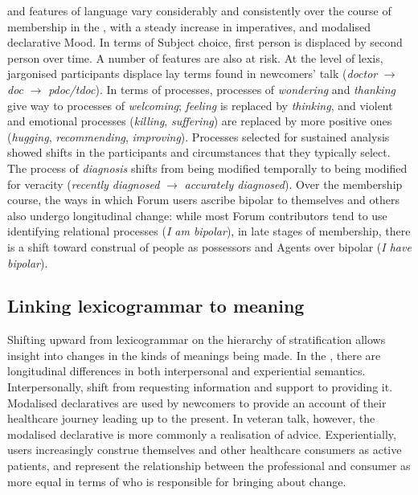  and  features of language vary considerably and consistently over the course of membership in the , with a steady increase in imperatives, and modalised declarative Mood. In terms of Subject choice, first person is displaced by second person over time. A number of  features are also at risk. At the level of lexis, jargonised participants displace lay terms found in newcomers' talk (\emph{doctor} $\rightarrow$ \emph{doc} $\rightarrow$ \emph{pdoc\slash tdoc}). In terms of processes, processes of \emph{wondering} and \emph{thanking} give way to processes of \emph{welcoming}; \emph{feeling} is replaced by \emph{thinking}, and violent and emotional processes (\emph{killing}, \emph{suffering}) are replaced by more positive ones (\emph{hugging}, \emph{recommending}, \emph{improving}). Processes selected for sustained analysis showed shifts in the participants and circumstances that they typically select. The process of \emph{diagnosis} shifts from being modified temporally to being modified for veracity (\emph{recently diagnosed} $\rightarrow$ \emph{accurately diagnosed}). Over the membership course, the ways in which \gls{Forum} users ascribe \gls{bipolar} to themselves and others also undergo longitudinal change: while most Forum contributors tend to use identifying relational processes (\emph{I am bipolar}), in late stages of membership, there is a shift toward construal of people as possessors and Agents over \gls{bipolar} (\emph{I have bipolar}). %

\subsection{Linking lexicogrammar to meaning}

Shifting upward from lexicogrammar on the hierarchy of stratification allows insight into changes in the kinds of meanings being made. In the , there are longitudinal differences in both interpersonal and experiential semantics. Interpersonally,  shift from requesting information and support to providing it. Modalised declaratives are used by newcomers to provide an account of their healthcare journey leading up to the present. In veteran talk, however, the modalised declarative is more commonly a realisation of advice. Experientially, users increasingly construe themselves and other healthcare consumers as active patients, and represent the relationship between the professional and consumer as more equal in terms of who is responsible for bringing about change.

